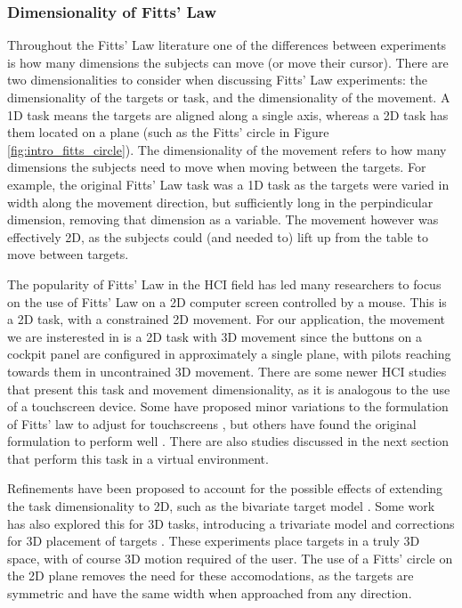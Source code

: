 \subsubsection{Dimensionality of Fitts' Law}\label{dimensionality-of-fitts-law}

Throughout the Fitts' Law literature one of the differences between experiments is how many dimensions the subjects can move (or move their cursor).
There are two dimensionalities to consider when discussing Fitts' Law experiments: the dimensionality of the targets or task, and the dimensionality of the movement.
A 1D task means the targets are aligned along a single axis, whereas a 2D task has them located on a plane (such as the Fitts' circle in Figure \ref{fig:intro_fitts_circle}).
The dimensionality of the movement refers to how many dimensions the subjects need to move when moving between the targets.
For example, the original Fitts' Law task was a 1D task as the targets were varied in width along the movement direction, but sufficiently long in the perpindicular dimension, removing that dimension as a variable.
The movement however was effectively 2D, as the subjects could (and needed to) lift up from the table to move between targets.

The popularity of Fitts' Law in the HCI field has led many researchers to focus on the use of Fitts' Law on a 2D computer screen controlled by a mouse.
This is a 2D task, with a constrained 2D movement.
For our application, the movement we are insterested in is a 2D task with 3D movement since the buttons on a cockpit panel are configured in approximately a single plane, with pilots reaching towards them in uncontrained 3D movement.
There are some newer HCI studies that present this task and movement dimensionality, as it is analogous to the use of a touchscreen device.
Some have proposed minor variations to the formulation of Fitts' law to adjust for touchscreens \citep{bi_ffitts_2013,sears_high_1991}, but others have found the original formulation to perform well \citep{mackenzie_fitts_2015}.
There are also studies discussed in the next section that perform this task in a virtual environment.

Refinements have been proposed to account for the possible effects of extending the task dimensionality to 2D, such as the bivariate target model \citep{accot_refining_2003, mackenzie_extending_1992, wobbrock_error_2008}.
Some work has also explored this for 3D tasks, introducing a trivariate model \citep{grossman_pointing_2004} and corrections for 3D placement of targets \citep{cha_extended_2013, murata_extending_2001}.
These experiments place targets in a truly 3D space, with of course 3D motion required of the user.
The use of a Fitts' circle on the 2D plane removes the need for these accomodations, as the targets are symmetric and have the same width when approached from any direction.

